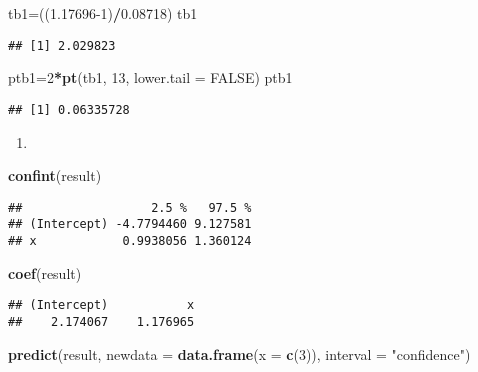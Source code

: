 \documentclass[
]{article}
\newenvironment{Shaded}{\begin{snugshade}}{\end{snugshade}}
\newcommand{\DataTypeTok}[1]{\textcolor[rgb]{0.13,0.29,0.53}{#1}}
\newcommand{\DecValTok}[1]{\textcolor[rgb]{0.00,0.00,0.81}{#1}}
\newcommand{\FloatTok}[1]{\textcolor[rgb]{0.00,0.00,0.81}{#1}}
\newcommand{\KeywordTok}[1]{\textcolor[rgb]{0.13,0.29,0.53}{\textbf{#1}}}
\newcommand{\NormalTok}[1]{#1}
\newcommand{\OperatorTok}[1]{\textcolor[rgb]{0.81,0.36,0.00}{\textbf{#1}}}
\newcommand{\OtherTok}[1]{\textcolor[rgb]{0.56,0.35,0.01}{#1}}
\newcommand{\StringTok}[1]{\textcolor[rgb]{0.31,0.60,0.02}{#1}}
\begin{document}
\begin{Shaded}
\begin{Highlighting}[]
\NormalTok{tb1=((}\FloatTok{1.17696}\DecValTok{-1}\NormalTok{)}\OperatorTok{/}\FloatTok{0.08718}\NormalTok{)}
\NormalTok{tb1}
\end{Highlighting}
\end{Shaded}

\begin{verbatim}
## [1] 2.029823
\end{verbatim}

\begin{Shaded}
\begin{Highlighting}[]
\NormalTok{ptb1=}\DecValTok{2}\OperatorTok{*}\KeywordTok{pt}\NormalTok{(tb1, }\DecValTok{13}\NormalTok{, }\DataTypeTok{lower.tail =} \OtherTok{FALSE}\NormalTok{)}
\NormalTok{ptb1}
\end{Highlighting}
\end{Shaded}

\begin{verbatim}
## [1] 0.06335728
\end{verbatim}

\begin{enumerate}
\def\labelenumi{(\alph{enumi})}
\setcounter{enumi}{5}
\item
\end{enumerate}

\begin{Shaded}
\begin{Highlighting}[]
\KeywordTok{confint}\NormalTok{(result)}
\end{Highlighting}
\end{Shaded}

\begin{verbatim}
##                  2.5 %   97.5 %
## (Intercept) -4.7794460 9.127581
## x            0.9938056 1.360124
\end{verbatim}

\begin{Shaded}
\begin{Highlighting}[]
\KeywordTok{coef}\NormalTok{(result)}
\end{Highlighting}
\end{Shaded}

\begin{verbatim}
## (Intercept)           x 
##    2.174067    1.176965
\end{verbatim}

\begin{Shaded}
\begin{Highlighting}[]
\KeywordTok{predict}\NormalTok{(result, }\DataTypeTok{newdata =} \KeywordTok{data.frame}\NormalTok{(}\DataTypeTok{x =} \KeywordTok{c}\NormalTok{(}\DecValTok{3}\NormalTok{)), }\DataTypeTok{interval =} \StringTok{"confidence"}\NormalTok{)}
\end{Highlighting}
\end{Shaded}
\end{document}
